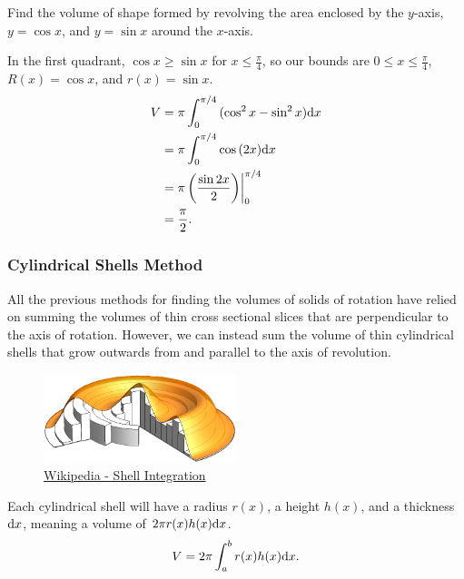 \begin{example}
	Find the volume of shape formed by revolving the area enclosed by the $y$-axis, $y=\cos{x}$, and $y=\sin{x}$ around the $x$-axis.
\end{example}
\begin{answer}
	In the first quadrant, $\cos{x} \geq \sin{x}$ for $x \leq \frac{\pi}{4}$, so our bounds are $0 \leq x \leq \frac{\pi}{4}$, $R(x)=\cos{x}$, and $r(x)=\sin{x}$.
	\begin{align*}
		V &= \pi\int_{0}^{\pi/4}{(\cos^2{x}-\sin^2{x})\mathrm{d} x} \\
		&= \pi\int_{0}^{\pi/4}{\cos{(2x)}\mathrm{d} x} \\
		&= \pi\left(\frac{\sin{2x}}{2}\right)\biggr\rvert_0^{\pi/4} \\
		&= \frac{\pi}{2}.
	\end{align*}
\end{answer}

\subsubsection{Cylindrical Shells Method}
All the previous methods for finding the volumes of solids of rotation have relied on summing the volumes of thin cross sectional slices that are perpendicular to the axis of rotation.
However, we can instead sum the volume of thin cylindrical shells that grow outwards from and parallel to the axis of revolution.

\begin{figure}[H]
	\label{shells}
	\centering
	\includegraphics[width=0.5\textwidth]{./applications_integrals/shells.png}
	\caption{\hyperref{https://en.wikipedia.org/wiki/Shell\_integration}{}{}{Wikipedia - Shell Integration}}
\end{figure}


Each cylindrical shell will have a radius $r(x)$, a height $h(x)$, and a thickness $\mathrm{d} x$, meaning a volume of $2\pi r(x)h(x)\mathrm{d} x$.
\begin{equation*}
	V = 2\pi\int_{a}^{b}{r(x)h(x)\mathrm{d} x}.
\end{equation*}

